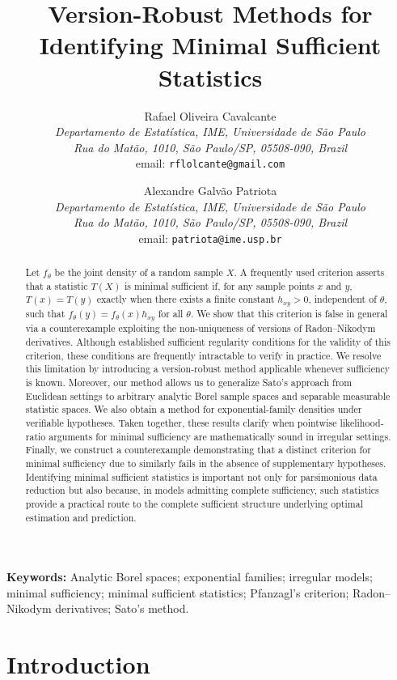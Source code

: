\documentclass[12pt]{article}
\title{Version-Robust Methods for Identifying Minimal Sufficient Statistics}
\author{Rafael Oliveira Cavalcante\\
     {\it \footnotesize Departamento de Estat\'istica, IME,
     Universidade de S\~ao Paulo}
     \vspace{-0.2cm}\\
     {\it \footnotesize Rua do Mat\~ao, 1010, S\~ao Paulo/SP, 05508-090, Brazil}
     \vspace{-0.2cm}\\
     {\footnotesize email: {\tt rflolcante@gmail.com}}
     \and
     Alexandre Galv\~ao Patriota\\
     {\it \footnotesize Departamento de Estat\'istica, IME,
     Universidade de S\~ao Paulo}
     \vspace{-0.2cm}\\
     {\it \footnotesize Rua do Mat\~ao, 1010, S\~ao Paulo/SP, 05508-090, Brazil}
     \vspace{-0.2cm}\\
     {\footnotesize email: {\tt patriota@ime.usp.br}}
}
\date{}
\begin{document}
\maketitle


\onehalfspacing
\begin{abstract}
Let $f_\theta$ be the joint density of a random sample $X$. A frequently used criterion asserts that a statistic $T(X)$ is minimal sufficient if, for any sample points $x$ and $y$, $T(x) = T(y)$ exactly when there exists a finite constant $h_{xy} > 0$, independent of $\theta$, such that $f_\theta(y) = f_\theta(x)h_{xy}$ for all $\theta$. We show that this criterion is false in general via a counterexample exploiting the non-uniqueness of versions of Radon--Nikodym derivatives. Although \cite{Sato1996} established sufficient regularity conditions for the validity of this criterion, these conditions are frequently intractable to verify in practice. We resolve this limitation by introducing a version-robust method applicable whenever sufficiency is known. Moreover, our method allows us to generalize Sato's approach from Euclidean settings to arbitrary analytic Borel sample spaces and separable measurable statistic spaces. We also obtain a method for exponential-family densities under verifiable hypotheses. Taken together, these results clarify when pointwise likelihood-ratio arguments for minimal sufficiency are mathematically sound in irregular settings. Finally, we construct a counterexample demonstrating that a distinct criterion for minimal sufficiency due to \cite{Pfanzagl1994, Pfanzagl2017} similarly fails in the absence of supplementary hypotheses.
 Identifying minimal sufficient statistics is important not only for parsimonious data reduction but also because, in models admitting complete sufficiency, such statistics provide a practical route to the complete sufficient structure underlying optimal estimation and prediction.
\end{abstract}


{\bf Keywords:} Analytic Borel spaces; exponential families; irregular models; minimal sufficiency; minimal sufficient statistics; Pfanzagl's criterion; Radon--Nikodym derivatives; Sato's method.

\section{Introduction}
\label{sec:intro}
\end{document}

